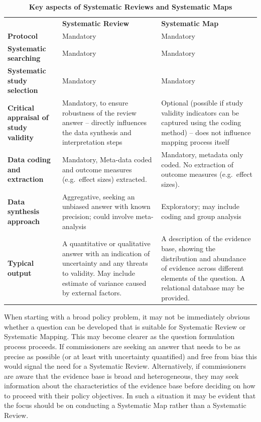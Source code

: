 \documentclass[
  letterpaper,
  DIV=11,
  numbers=noendperiod]{scrreprt}
\begin{document}
\begin{longtable}[]{@{}
  >{\raggedright\arraybackslash}p{}
  >{\raggedright\arraybackslash}p{}
  >{\raggedright\arraybackslash}p{}@{}}
\caption{\textbf{Key aspects of Systematic Reviews and Systematic
Maps}}\label{tbl-key-aspects}\tabularnewline
\toprule\noalign{}
\endfirsthead
\endhead
\bottomrule\noalign{}
\endlastfoot
& \textbf{Systematic Review} & \textbf{Systematic Map} \\
\textbf{Protocol} & Mandatory & Mandatory \\
\textbf{Systematic searching} & Mandatory & Mandatory \\
\textbf{Systematic study selection} & Mandatory & Mandatory \\
\textbf{Critical appraisal of study validity} & Mandatory, to ensure
robustness of the review answer -- directly influences the data
synthesis and interpretation steps & Optional (possible if study
validity indicators can be captured using the coding method) -- does not
influence mapping process itself \\
\textbf{Data coding and extraction} & Mandatory, Meta-data coded and
outcome measures (e.g.~effect sizes) extracted. & Mandatory, metadata
only coded. No extraction of outcome measures (e.g.~effect sizes). \\
\textbf{Data synthesis approach} & Aggregative, seeking an unbiased
answer with known precision; could involve meta-analysis & Exploratory;
may include coding and group analysis \\
\textbf{Typical output} & A quantitative or qualitative answer with an
indication of uncertainty and any threats to validity. May include
estimate of variance caused by external factors. & A description of the
evidence base, showing the distribution and abundance of evidence across
different elements of the question. A relational database may be
provided. \\
\end{longtable}

When starting with a broad policy problem, it may not be immediately
obvious whether a question can be developed that is suitable for
Systematic Review or Systematic Mapping. This may become clearer as the
question formulation process proceeds. If commissioners are seeking an
answer that needs to be as precise as possible (or at least with
uncertainty quantified) and free from bias this would signal the need
for a Systematic Review. Alternatively, if commissioners are aware that
the evidence base is broad and heterogeneous, they may seek information
about the characteristics of the evidence base before deciding on how to
proceed with their policy objectives. In such a situation it may be
evident that the focus should be on conducting a Systematic Map rather
than a Systematic Review.
\end{document}
